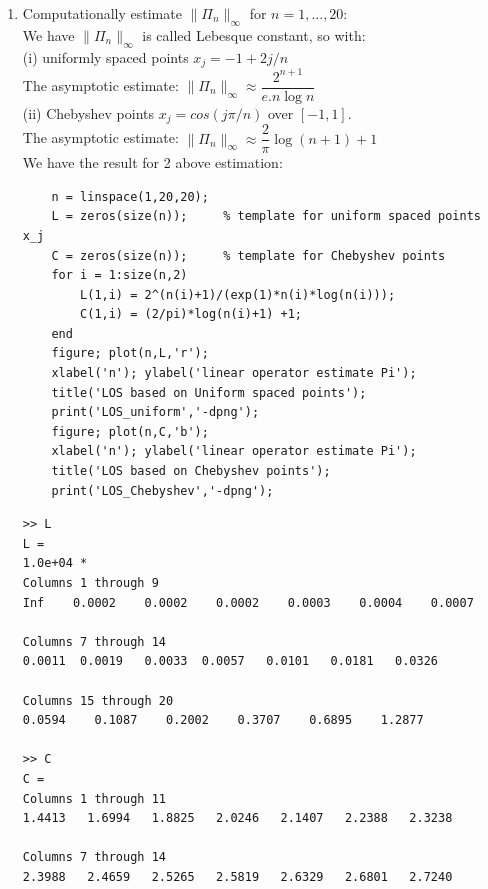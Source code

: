 \documentclass[14pt,a4paper]{article}
\begin{document}
\begin{enumerate}
	
	\label{3e}
	\item Computationally estimate $\|\Pi_n\|_{\infty}$ for $n = 1, ..., 20$:\\
	We have $\|\Pi_n\|_{\infty}$ is called Lebesque constant, so with:\\
	(i) uniformly spaced points $x_j = -1 + 2j/n$\\
	The asymptotic estimate: $\|\Pi_n\|_{\infty} \approx \dfrac{2^{n+1}}{e.n\log n}$ \\
	(ii) Chebyshev points $x_j = cos(j\pi /n)$ over $[-1,1]$.\\
	The asymptotic estimate: $\|\Pi_n\|_{\infty} \approx \dfrac{2}{\pi}\log(n+1) +1$\\ 
	
	We have the result for 2 above estimation:\\
	\begin{lstlisting}
	n = linspace(1,20,20);
	L = zeros(size(n));     % template for uniform spaced points x_j
	C = zeros(size(n));     % template for Chebyshev points
	for i = 1:size(n,2)
		L(1,i) = 2^(n(i)+1)/(exp(1)*n(i)*log(n(i)));
		C(1,i) = (2/pi)*log(n(i)+1) +1;
	end
	figure; plot(n,L,'r');
	xlabel('n'); ylabel('linear operator estimate Pi');
	title('LOS based on Uniform spaced points');
	print('LOS_uniform','-dpng');
	figure; plot(n,C,'b');
	xlabel('n'); ylabel('linear operator estimate Pi');
	title('LOS based on Chebyshev points');
	print('LOS_Chebyshev','-dpng');
	\end{lstlisting}
	\begin{lstlisting}
>> L
L =
1.0e+04 *
Columns 1 through 9
Inf    0.0002    0.0002    0.0002    0.0003    0.0004    0.0007     

Columns 7 through 14
0.0011  0.0019	 0.0033  0.0057	  0.0101   0.0181   0.0326

Columns 15 through 20
0.0594    0.1087    0.2002    0.3707    0.6895    1.2877

>> C
C =
Columns 1 through 11
1.4413   1.6994   1.8825   2.0246   2.1407   2.2388   2.3238 

Columns 7 through 14
2.3988   2.4659   2.5265   2.5819	2.6329   2.6801   2.7240 


\end{lstlisting}
\end{enumerate}
\end{document}
